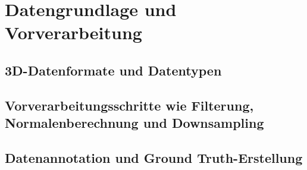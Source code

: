 \chapter{Datengrundlage und Vorverarbeitung}
\section{3D-Datenformate und Datentypen}
\section{Vorverarbeitungsschritte wie Filterung, Normalenberechnung und Downsampling}
\section{Datenannotation und Ground Truth-Erstellung}